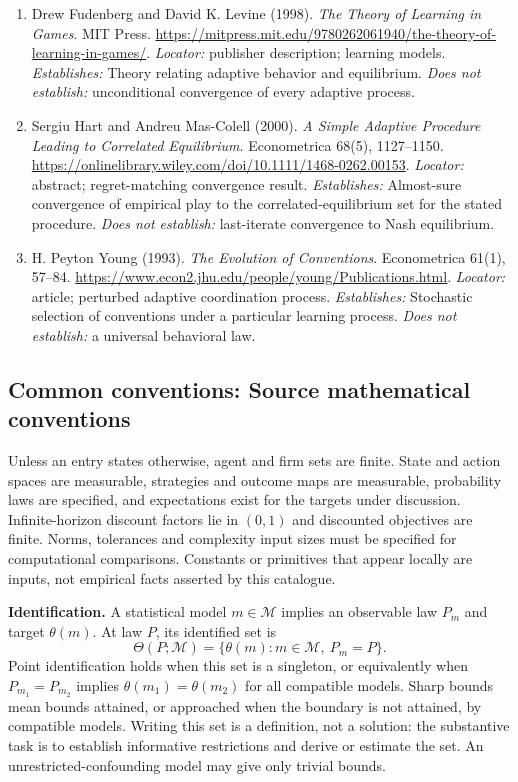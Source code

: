 \documentclass[11pt,a4paper]{article}
\begin{document}
\begin{enumerate}

\item[S1] Drew Fudenberg and David K. Levine (1998). \emph{The Theory of Learning in Games}. MIT Press. \url{https://mitpress.mit.edu/9780262061940/the-theory-of-learning-in-games/}. \textit{Locator:} publisher description; learning models. \textit{Establishes:} Theory relating adaptive behavior and equilibrium. \textit{Does not establish:} unconditional convergence of every adaptive process.

\item[S2] Sergiu Hart and Andreu Mas-Colell (2000). \emph{A Simple Adaptive Procedure Leading to Correlated Equilibrium}. Econometrica 68(5), 1127--1150. \url{https://onlinelibrary.wiley.com/doi/10.1111/1468-0262.00153}. \textit{Locator:} abstract; regret-matching convergence result. \textit{Establishes:} Almost-sure convergence of empirical play to the correlated-equilibrium set for the stated procedure. \textit{Does not establish:} last-iterate convergence to Nash equilibrium.

\item[S3] H. Peyton Young (1993). \emph{The Evolution of Conventions}. Econometrica 61(1), 57--84. \url{https://www.econ2.jhu.edu/people/young/Publications.html}. \textit{Locator:} article; perturbed adaptive coordination process. \textit{Establishes:} Stochastic selection of conventions under a particular learning process. \textit{Does not establish:} a universal behavioral law.

\end{enumerate}

\subsection*{Common conventions: Source mathematical conventions}

Unless an entry states otherwise, agent and firm sets are finite. State and action spaces are measurable, strategies and outcome maps are measurable, probability laws are specified, and expectations exist for the targets under discussion. Infinite-horizon discount factors lie in $(0,1)$ and discounted objectives are finite. Norms, tolerances and complexity input sizes must be specified for computational comparisons. Constants or primitives that appear locally are inputs, not empirical facts asserted by this catalogue.

\textbf{Identification.} A statistical model $m\in\mathcal M$ implies an observable law $P_m$ and target $\theta(m)$. At law $P$, its identified set is
\[
\Theta(P;\mathcal M)=\{\theta(m):m\in\mathcal M,\ P_m=P\}.
\]
Point identification holds when this set is a singleton, or equivalently when $P_{m_1}=P_{m_2}$ implies $\theta(m_1)=\theta(m_2)$ for all compatible models. Sharp bounds mean bounds attained, or approached when the boundary is not attained, by compatible models. Writing this set is a definition, not a solution: the substantive task is to establish informative restrictions and derive or estimate the set. An unrestricted-confounding model may give only trivial bounds.
\end{document}
